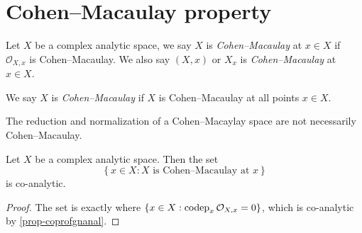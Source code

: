 \iffalse
\begin{corollary}\label{cor-specangeqnanalyt}
    Let $X$ be a complex analytic space, $\mathcal{A}$ be a finite $\mathcal{O}_X$-algebra and $n\in \mathbb{N}$. Let $X'=\Spec_X^{\An}\mathcal{A}$.
    Then the set
    \[
        \left\{x\in X: \# X'_x \leq n \right\}  
    \]
    is an analytic set in $X$.
\end{corollary}
\begin{proof}
    By \cref{ConstructionComplex-cor-finitespectrumidentification} in \nameref{ConstructionComplex-chap-constructionComplex}, $\# X'_x=\rank_x \mathcal{A}$ for each $x\in X$. So the claim follows from \cref{lma-rankgeqnana}.
\end{proof}

\begin{corollary}
    Let $X$ be a complex analytic space. Then the set 
    \[
        \left\{ x\in X : X \text{ is unibranch at }x \right\}  
    \]
    is co-analytic, whose complement is nowhere dense.
\end{corollary}
\begin{proof}
    We may assume that $X$ is reduced by \cref{prop-unibranchchar}. 
    Applying \cref{cor-specangeqnanalyt} to the normalization of $X$ with $n=2$, we conclude that the set is co-analytic. To show that its complement is nowhere dense, it suffices to observe that the latter is contained in $X^{\Sing}$, which is nowhere dense by \cref{thm-gensmooth}.
\end{proof}
\fi

\section{Cohen--Macaulay property}
\begin{definition}
    Let $X$ be a complex analytic space, we say $X$ is \emph{Cohen--Macaulay} at $x\in X$ if $\mathcal{O}_{X,x}$ is Cohen--Macaulay. We also say $(X,x)$ or $X_x$ is \emph{Cohen--Macaulay} at $x\in X$.

    We say $X$ is \emph{Cohen--Macaulay} if $X$ is Cohen--Macaulay at all points $x\in X$. 
\end{definition}



The reduction and normalization of a Cohen--Macaylay space are not necessarily Cohen--Macaulay.

\begin{thm}
    Let $X$ be a complex analytic space. Then the set
    \[
        \left\{ x\in X: X\text{ is Cohen--Macaulay at }x \right\}  
    \]
    is co-analytic.
\end{thm}
\begin{proof}
    The set is exactly where $\{x\in X:\operatorname{codep}_x \mathcal{O}_{X,x}=0\}$, which is co-analytic by \cref{prop-coprofgnanal}.
\end{proof}

\printbibliography
